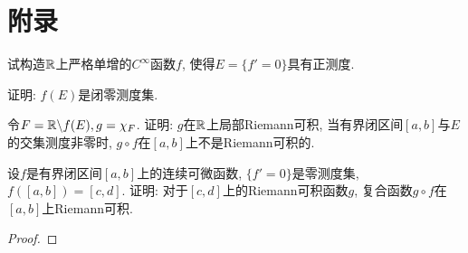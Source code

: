 \section{附录}
\begin{quiza}
\woe \vspace*{-\baselineskip}
\begin{quizs}
\item 试构造\(\mathbb{R}\)上严格单增的\(C^\infty\)函数\(f\), 使得\(E=\{f'=0\}\)具有正测度.
\item 证明: \(f(E)\)是闭零测度集.
\item 令\(F=\mathbb{R}\backslash f(E),g=\chi_F\). 证明: \(g\)在\(\mathbb{R}\)上局部Riemann可积, 当有界闭区间\([a,b]\)与\(E\)的交集测度非零时, \(g\circ f\)在\([a,b]\)上不是Riemann可积的.
\end{quizs} 
\end{quiza}
\begin{quizb}
\woe 设\(f\)是有界闭区间\([a,b]\)上的连续可微函数, \(\{f'=0\}\)是零测度集, \(f\left([a,b]\right)=[c,d]\). 证明: 对于\([c,d]\)上的Riemann可积函数\(g\), 复合函数\(g\circ f\)在\([a,b]\)上Riemann可积.
\begin{proof}

\end{proof}
\end{quizb}